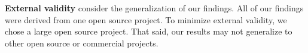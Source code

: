 \noindent \textbf{External validity} consider the generalization of our findings. All of our findings were derived from one open source project. To minimize external validity, we chose a large open source project. That said, our results may not generalize to other open source or commercial projects.
